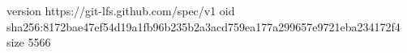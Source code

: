 version https://git-lfs.github.com/spec/v1
oid sha256:8172bae47ef54d19a1fb96b235b2a3acd759ea177a299657e9721eba234172f4
size 5566
